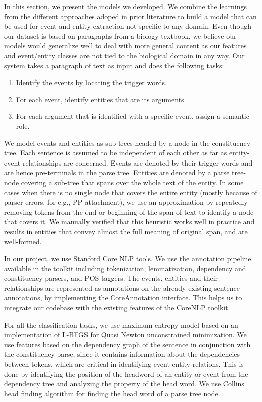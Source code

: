 In this section, we present the models we developed. We combine the learnings from the different approaches adoped in prior literature to build a model that can be used for event and entity extraction not specific to any domain. Even though our dataset is based on paragraphs from a biology textbook, we believe our models would generalize well to deal with more general content as our features and event/entity classes are not tied to the biological domain in any way. Our system takes a paragraph of text as input and does the following tasks:

\begin{enumerate}
\item Identify the events by locating the trigger words.
\item For each event, identify entities that are its arguments.
\item For each argument that is identified with a specific event, assign a semantic role.
\end{enumerate}

We model events and entities as sub-trees headed by a node in the constituency tree. Each sentence is assumed to be independent of each other as far as entity-event relationships are concerned. Events are denoted by their trigger words and are hence pre-terminals in the parse tree. Entities are denoted by a parse tree-node covering a sub-tree that spans over the whole text of the entity. In some cases when there is no single node that covers the entire entity (mostly because of parser errors, for e.g., PP attachment), we use an approximation by repeatedly removing tokens from the end or beginning of the span of text to identify a node that covers it. We manually verified that this heuristic works well in practice and results in entities that convey almost the full meaning of original span, and are well-formed.

In our project, we use Stanford Core NLP tools. We use the annotation pipeline available in the toolkit including tokenization, lemmatization, dependency and constituency parsers, and POS taggers. The events, entities and their relationships are represented as annotations on the already existing sentence annotations, by implementing the CoreAnnotation interface. This helps us to integrate our codebase with the existing features of the CoreNLP toolkit.

For all the classification tasks, we use maximum entropy model based on an implementation of L-BFGS for Quasi Newton unconstrained minimization. We use features based on the dependency graph of the sentence in conjunction with the constituency parse, since it contains information about the dependencies between tokens, which are critical in identifying event-entity relations. This is done by identifying the position of the headword of an entity or event from the dependency tree and analyzing the property of the head word. We use Collins head finding algorithm for finding the head word of a parse tree node. 

